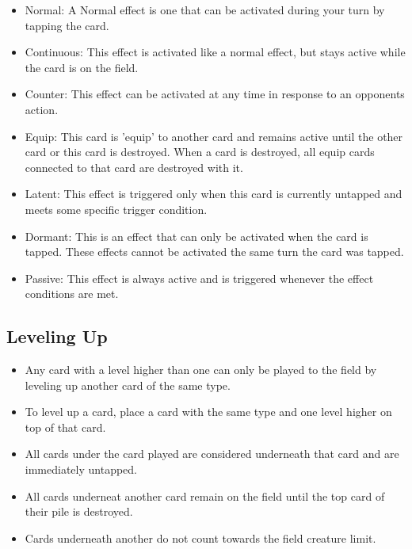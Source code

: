 \begin{itemize}
\begin{itemize}
        \item Normal: A Normal effect is one that can be activated during your turn by tapping the card.
        \item Continuous: This effect is activated like a normal effect, but stays active while the card is on the field.
		\item Counter: This effect can be activated at any time in response to an opponents action.
		\item Equip: This card is 'equip' to another card and remains active until the other card or this card is destroyed. When a card is destroyed, all equip cards connected to that card are destroyed with it.
		\item Latent: This effect is triggered only when this card is currently untapped and meets some specific trigger condition. 
		\item Dormant: This is an effect that can only be activated when the card is tapped. These effects cannot be activated the same turn the card was tapped.
  		\item Passive: This effect is always active and is triggered whenever the effect conditions are met.
    \end{itemize}
\end{itemize}








\subsection{Leveling Up}
\begin{itemize}
    \item Any card with a level higher than one can only be played to the field by leveling up another card of the same type.
    \item To level up a card, place a card with the same type and one level higher on top of that card.
    \item All cards under the card played are considered underneath that card and are immediately untapped.
    \item All cards underneat another card remain on the field until the top card of their pile is destroyed.
    \item Cards underneath another do not count towards the field creature limit.
\end{itemize}








